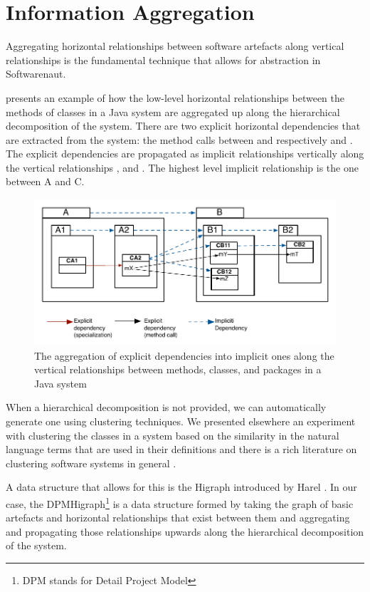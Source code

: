 \documentclass[preprint,12pt]{elsarticle}
\begin{document}
\newpage
\section {Information Aggregation}
\label{sec:org}

Aggregating horizontal relationships between software artefacts along vertical relationships is the fundamental technique that allows for abstraction in Softwarenaut. 

 presents an example of how the low-level horizontal relationships between the methods of classes in a Java system are aggregated up along the hierarchical decomposition of the system. There are two explicit horizontal dependencies that are extracted from the system: the method calls between  and respectively  and . 
The explicit dependencies are propagated as implicit relationships vertically along the vertical relationships ,  and . The highest level implicit relationship is the one between A and C. 


\begin{figure}[h]
\begin{center}
\includegraphics[width=0.6\linewidth]{images/DependencyAggregation}
\caption{The aggregation of explicit dependencies into implicit ones along the vertical relationships between methods, classes, and packages in a Java system}
\end{center}
\end{figure}

When a hierarchical decomposition is not provided, we can automatically generate one using clustering techniques. We presented elsewhere an experiment with clustering the classes in a system based on the similarity in the natural language terms that are used in their definitions \cite{Lung05a} and there is a rich literature on clustering software systems in general \cite{koschke-thesis}.

A data structure that allows for this is the Higraph introduced by Harel \cite{harel-visform}. In our case, the DPMHigraph\footnote{DPM stands for Detail Project Model} is a data structure formed by taking the graph of basic artefacts and horizontal relationships that exist between them and aggregating and propagating those relationships upwards along the hierarchical decomposition of the system. 
\end{document}
